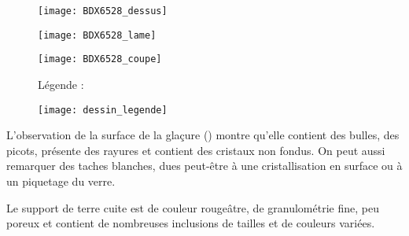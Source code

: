 \begin{figure}[htb]
  \begin{minipage}[t]{0.5\textwidth}
    \centerfloat
    \vspace*{0pt}
    \texttt{[image: BDX6528\_dessus]}
  \end{minipage}%
  \quad%
  \begin{minipage}[t]{0.5\textwidth}
    \centerfloat
    \vspace*{0pt}
    \texttt{[image: BDX6528\_lame]}
  \end{minipage}

  \bigskip

  \begin{minipage}[t]{0.5\textwidth}
    \centerfloat
    \vspace*{0pt}
    \texttt{[image: BDX6528\_coupe]}
  \end{minipage}%
  \quad%
  \begin{minipage}[t]{0.5\textwidth}
    \vspace*{0pt}
    Légende :

    \texttt{[image: dessin\_legende]}
  \end{minipage}
  \caption[]{\legendeA 
          }
  \label{dessin:6528}
\end{figure}

L'observation de la surface de la glaçure () montre 
qu'elle contient des bulles, des picots, présente des rayures et 
contient des cristaux non fondus. On peut aussi remarquer des taches 
blanches, dues peut-être à une cristallisation en surface ou à un 
piquetage du verre.

Le support de terre cuite est de couleur rougeâtre, de granulométrie 
fine, peu poreux et contient de nombreuses inclusions de tailles et 
de couleurs variées.

